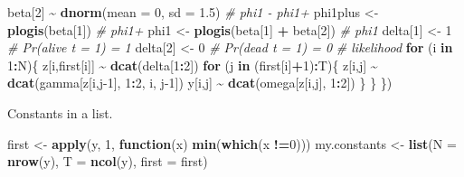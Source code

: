 \documentclass[
  12pt,
]{krantz}
\newenvironment{Shaded}{\begin{snugshade}}{\end{snugshade}}
\newcommand{\AttributeTok}[1]{\textcolor[rgb]{0.13,0.29,0.53}{#1}}
\newcommand{\CommentTok}[1]{\textcolor[rgb]{0.56,0.35,0.01}{\textit{#1}}}
\newcommand{\ControlFlowTok}[1]{\textcolor[rgb]{0.13,0.29,0.53}{\textbf{#1}}}
\newcommand{\DecValTok}[1]{\textcolor[rgb]{0.00,0.00,0.81}{#1}}
\newcommand{\FloatTok}[1]{\textcolor[rgb]{0.00,0.00,0.81}{#1}}
\newcommand{\FunctionTok}[1]{\textcolor[rgb]{0.13,0.29,0.53}{\textbf{#1}}}
\newcommand{\NormalTok}[1]{#1}
\newcommand{\OtherTok}[1]{\textcolor[rgb]{0.56,0.35,0.01}{#1}}
\newcommand{\SpecialCharTok}[1]{\textcolor[rgb]{0.81,0.36,0.00}{\textbf{#1}}}
\begin{document}
\begin{Shaded}
\begin{Highlighting}[]
\NormalTok{  beta[}\DecValTok{2}\NormalTok{] }\SpecialCharTok{\textasciitilde{}} \FunctionTok{dnorm}\NormalTok{(}\AttributeTok{mean =} \DecValTok{0}\NormalTok{, }\AttributeTok{sd =} \FloatTok{1.5}\NormalTok{) }\CommentTok{\# phi1 {-} phi1+}
\NormalTok{  phi1plus }\OtherTok{\textless{}{-}} \FunctionTok{plogis}\NormalTok{(beta[}\DecValTok{1}\NormalTok{])         }\CommentTok{\# phi1+}
\NormalTok{  phi1 }\OtherTok{\textless{}{-}} \FunctionTok{plogis}\NormalTok{(beta[}\DecValTok{1}\NormalTok{] }\SpecialCharTok{+}\NormalTok{ beta[}\DecValTok{2}\NormalTok{])   }\CommentTok{\# phi1}
\NormalTok{  delta[}\DecValTok{1}\NormalTok{] }\OtherTok{\textless{}{-}} \DecValTok{1}          \CommentTok{\# Pr(alive t = 1) = 1}
\NormalTok{  delta[}\DecValTok{2}\NormalTok{] }\OtherTok{\textless{}{-}} \DecValTok{0}          \CommentTok{\# Pr(dead t = 1) = 0}
  \CommentTok{\# likelihood}
  \ControlFlowTok{for}\NormalTok{ (i }\ControlFlowTok{in} \DecValTok{1}\SpecialCharTok{:}\NormalTok{N)\{}
\NormalTok{    z[i,first[i]] }\SpecialCharTok{\textasciitilde{}} \FunctionTok{dcat}\NormalTok{(delta[}\DecValTok{1}\SpecialCharTok{:}\DecValTok{2}\NormalTok{])}
    \ControlFlowTok{for}\NormalTok{ (j }\ControlFlowTok{in}\NormalTok{ (first[i]}\SpecialCharTok{+}\DecValTok{1}\NormalTok{)}\SpecialCharTok{:}\NormalTok{T)\{}
\NormalTok{      z[i,j] }\SpecialCharTok{\textasciitilde{}} \FunctionTok{dcat}\NormalTok{(gamma[z[i,j}\DecValTok{{-}1}\NormalTok{], }\DecValTok{1}\SpecialCharTok{:}\DecValTok{2}\NormalTok{, i, j}\DecValTok{{-}1}\NormalTok{])}
\NormalTok{      y[i,j] }\SpecialCharTok{\textasciitilde{}} \FunctionTok{dcat}\NormalTok{(omega[z[i,j], }\DecValTok{1}\SpecialCharTok{:}\DecValTok{2}\NormalTok{])}
\NormalTok{    \}}
\NormalTok{  \}}
\NormalTok{\})}
\end{Highlighting}
\end{Shaded}

Constants in a list.

\begin{Shaded}
\begin{Highlighting}[]
\NormalTok{first }\OtherTok{\textless{}{-}} \FunctionTok{apply}\NormalTok{(y, }\DecValTok{1}\NormalTok{, }\ControlFlowTok{function}\NormalTok{(x) }\FunctionTok{min}\NormalTok{(}\FunctionTok{which}\NormalTok{(x }\SpecialCharTok{!=}\DecValTok{0}\NormalTok{)))}
\NormalTok{my.constants }\OtherTok{\textless{}{-}} \FunctionTok{list}\NormalTok{(}\AttributeTok{N =} \FunctionTok{nrow}\NormalTok{(y), }
                     \AttributeTok{T =} \FunctionTok{ncol}\NormalTok{(y), }
                     \AttributeTok{first =}\NormalTok{ first)}
\end{Highlighting}
\end{Shaded}
\end{document}
